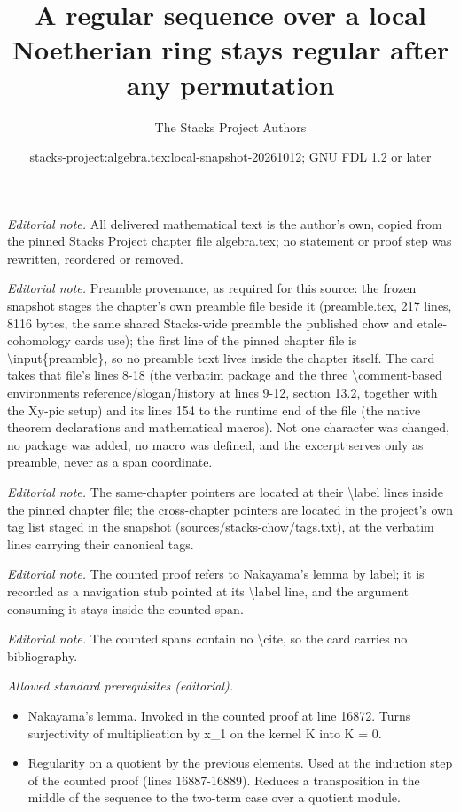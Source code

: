 \documentclass[10pt,a4paper]{amsart}
\title{A regular sequence over a local Noetherian ring stays regular after any permutation}
\author{The Stacks Project Authors}
\date{stacks-project:algebra.tex:local-snapshot-20261012; GNU FDL 1.2 or later}
\theoremstyle{plain}
\theoremstyle{definition}
\theoremstyle{remark}
\numberwithin{equation}{subsection}
\begin{document}
\maketitle
\noindent\textit{Editorial note.} All delivered mathematical text is the author's own, copied from the pinned Stacks Project chapter file algebra.tex; no statement or proof step was rewritten, reordered or removed.\par\medskip
\noindent\textit{Editorial note.} Preamble provenance, as required for this source: the frozen snapshot stages the chapter's own preamble file beside it (preamble.tex, 217 lines, 8116 bytes, the same shared Stacks-wide preamble the published chow and etale-cohomology cards use); the first line of the pinned chapter file is \textbackslash{}input\{preamble\}, so no preamble text lives inside the chapter itself. The card takes that file's lines 8-18 (the verbatim package and the three \textbackslash{}comment-based environments reference/slogan/history at lines 9-12, section 13.2, together with the Xy-pic setup) and its lines 154 to the runtime end of the file (the native theorem declarations and mathematical macros). Not one character was changed, no package was added, no macro was defined, and the excerpt serves only as preamble, never as a span coordinate.\par\medskip
\noindent\textit{Editorial note.} The same-chapter pointers are located at their \textbackslash{}label lines inside the pinned chapter file; the cross-chapter pointers are located in the project's own tag list staged in the snapshot (sources/stacks-chow/tags.txt), at the verbatim lines carrying their canonical tags.\par\medskip
\noindent\textit{Editorial note.} The counted proof refers to Nakayama's lemma by label; it is recorded as a navigation stub pointed at its \textbackslash{}label line, and the argument consuming it stays inside the counted span.\par\medskip
\noindent\textit{Editorial note.} The counted spans contain no \textbackslash{}cite, so the card carries no bibliography.\par\medskip
\noindent\textit{Allowed standard prerequisites (editorial).}\begin{itemize}
\item Nakayama's lemma. Invoked in the counted proof at line 16872. Turns surjectivity of multiplication by x\_1 on the kernel K into K = 0.
\item Regularity on a quotient by the previous elements. Used at the induction step of the counted proof (lines 16887-16889). Reduces a transposition in the middle of the sequence to the two-term case over a quotient module.
\end{itemize}\medskip
\end{document}
